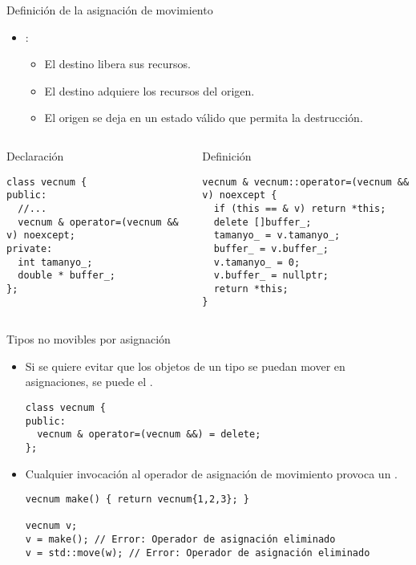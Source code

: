 \begin{frame}[t,fragile]{Definición de la asignación de movimiento}
\begin{itemize}
  \item {}:
    \begin{itemize}
      \item El destino libera sus recursos.
      \item El destino adquiere los recursos del origen.
      \item El origen se deja en un estado válido que permita la destrucción.
    \end{itemize}
\end{itemize}	

\begin{columns}[T]

\begin{block}{Declaración}
\begin{lstlisting}
class vecnum {
public:
  //...
  vecnum & operator=(vecnum && v) noexcept;
private:
  int tamanyo_;
  double * buffer_;
};
\end{lstlisting}
\end{block}

\pause
{}
\begin{block}{Definición}
\begin{lstlisting}
vecnum & vecnum::operator=(vecnum && v) noexcept {
  if (this == & v) return *this;
  delete []buffer_;
  tamanyo_ = v.tamanyo_;
  buffer_ = v.buffer_;
  v.tamanyo_ = 0;
  v.buffer_ = nullptr;
  return *this;
}
\end{lstlisting}
\end{block}

\end{columns}
\end{frame}

\begin{frame}[t,fragile]{Tipos no movibles por asignación}
\begin{itemize}
  \item Si se quiere evitar que los objetos de un tipo se puedan mover en asignaciones,
       se puede  el .
\begin{lstlisting}
class vecnum {
public:
  vecnum & operator=(vecnum &&) = delete;
};
\end{lstlisting}

  \item Cualquier invocación al operador de asignación de movimiento provoca un
        .
\begin{lstlisting}
vecnum make() { return vecnum{1,2,3}; }

vecnum v;
v = make(); // Error: Operador de asignación eliminado
v = std::move(w); // Error: Operador de asignación eliminado
\end{lstlisting}
\end{itemize}
\end{frame}
